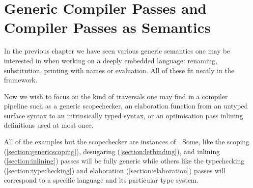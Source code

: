 \chapter{Generic Compiler Passes and Compiler Passes as Semantics}

In the previous chapter we have seen various generic semantics one may be
interested in when working on a deeply embedded language: renaming,
substitution, printing with names or evaluation. All of these fit neatly
in the  framework.

Now we wish to focus on the kind of traversals one may find in a compiler
pipeline such as a generic scopechecker, an elaboration function from an
untyped surface syntax to an intrinsically typed syntax, or an optimisation
pass inlining definitions used at most once.

All of the examples but the scopechecker are instances of .
Some, like the scoping (\cref{section:genericscoping}), desugaring
(\cref{section:letbinding}), and inlining (\cref{section:inlining}) passes
will be fully generic while others like the typechecking
(\cref{section:typechecking}) and elaboration (\cref{section:elaboration})
passes will correspond to a specific language and its particular type
system.






